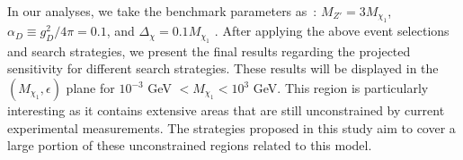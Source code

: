 \documentclass[preprint, superscriptaddress,amsmath, nofootinbib]{revtex4-1}
\begin{document}
In our analyses, we take the benchmark parameters as~\cite{Kang:2021oes,Berlin:2018jbm,Izaguirre:2017bqb,Izaguirre:2015zva,Bertuzzo:2022ozu}: $M_{Z'} = 3 M_{\chi_{1}}$, $\alpha_{D} \equiv g_{D}^{2}/4\pi =0.1$, and $\Delta_{\chi}= 0.1 M_{\chi_{1}}$ . After applying the above event selections and search strategies, we present the final results regarding the projected sensitivity for different search strategies. These results will be displayed in the $\left(M_{\chi_1}, \epsilon\right)$ plane for $10^{-3}$ GeV $< M_{\chi_1} < 10^{3}$ GeV. This region is particularly interesting as it contains extensive areas that are still unconstrained by current experimental measurements. The strategies proposed in this study aim to cover a large portion of these unconstrained regions related to this model. 
\end{document}
